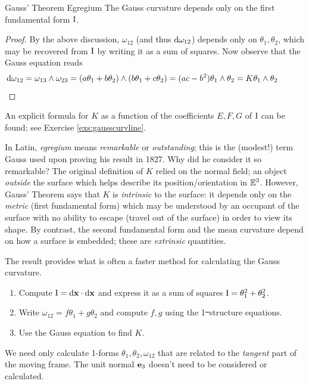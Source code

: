 \begin{thm}{Gauss' Theorem Egregium}{}
The Gauss curvature depends only on the first fundamental form $\mathrm{I}$.
\end{thm}

\begin{proof}
By the above discussion, $\omega_{12}$ (and thus $\mathrm{d}\omega_{12}$) depends only on $\theta_1,\theta_2$, which may be recovered from $\mathrm{I}$ by writing it as a sum of squares. Now observe that the Gauss equation reads 
\begin{align*}
\mathrm{d}\omega_{12}&=\omega_{13}\wedge\omega_{23}=(a\theta_1+b\theta_2)\wedge(b\theta_1+c\theta_2)=(ac-b^2)\theta_1\wedge\theta_2=K\theta_1\wedge\theta_2\tag*{\qedhere}
\end{align*}
\end{proof}

An explicit formula for $K$ as a function of the coefficients $E,F,G$ of $\mathrm{I}$ can be found; see Exercise \ref{exs:gausscurvline}.\smallbreak

In Latin, \emph{egregium} means \emph{remarkable} or \emph{outstanding}; this is the (modest!) term Gauss used upon proving his result in 1827. Why did he consider it so remarkable? The original definition of $K$ relied on the normal field; an object \emph{outside} the surface which helps describe its position/orientation in $\mathbb{E}^3$. However, Gauss' Theorem says that $K$ is \emph{intrinsic} to the surface: it depends only on the \emph{metric} (first fundamental form) which may be understood by an occupant of the surface with no ability to escape (travel out of the surface) in order to view its shape. By contrast, the second fundamental form and the mean curvature depend on how a surface is embedded; these are \emph{extrinsic} quantities.\medbreak


The result provides what is often a faster method for calculating the Gauss curvature.
\begin{enumerate}
  \item Compute $\mathrm{I}=\mathrm{d}{\mathbf{x}}\cdot\mathrm{d}{\mathbf{x}}$ and express it as a sum of squares $\mathrm{I}=\theta_1^2+\theta_2^2$.
  \item Write $\omega_{12}=f\theta_1+g\theta_2$ and compute $f,g$ using the 1\st\ structure equations.
  \item Use the Gauss equation to find $K$.
\end{enumerate}

We need only calculate 1-forms $\theta_1,\theta_2,\omega_{12}$ that are related to the \emph{tangent} part of the moving frame. The unit normal ${\mathbf{e}}_3$ doesn't need to be considered or calculated.

